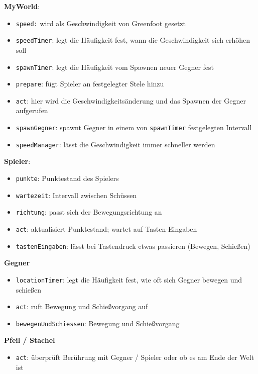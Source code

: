 \documentclass{scrartcl}   %
\begin{document}
\begin{itemize}
    \barrow \textbf{MyWorld}:
    \begin{itemize}
        \item \texttt{speed:} wird als Geschwindigkeit von Greenfoot gesetzt
        \item \texttt{speedTimer}: legt die Häufigkeit fest, wann die Geschwindigkeit sich erhöhen soll
        \item \texttt{spawnTimer}: legt die Häufigkeit vom Spawnen neuer Gegner fest
        \item \texttt{prepare}: fügt Spieler an festgelegter Stele hinzu
        \item \texttt{act}: hier wird die Geschwindigkeitsänderung und das Spawnen der Gegner aufgerufen
        \item \texttt{spawnGegner}: spawnt Gegner in einem von \texttt{spawnTimer} festgelegten Intervall
        \item \texttt{speedManager}: lässt die Geschwindigkeit immer schneller werden
    \end{itemize}
    \barrow \textbf{Spieler}:
    \begin{itemize}
        \item \texttt{punkte}: Punktestand des Spielers
        \item \texttt{wartezeit}: Intervall zwischen Schüssen
        \item \texttt{richtung}: passt sich der Bewegungsrichtung an
        \item \texttt{act}: aktualisiert Punktestand; wartet auf Tasten-Eingaben
        \item \texttt{tastenEingaben}: lässt bei Tastendruck etwas passieren (Bewegen, Schießen)
    \end{itemize}
    \barrow \textbf{Gegner}
    \begin{itemize}
        \item \texttt{locationTimer}: legt die Häufigkeit fest, wie oft sich Gegner bewegen und schießen
        \item \texttt{act}: ruft Bewegung und Schießvorgang auf
        \item \texttt{bewegenUndSchiessen}: Bewegung und Schießvorgang
    \end{itemize}
    \barrow \textbf{Pfeil / Stachel}
    \begin{itemize}
        \item \texttt{act}: überprüft Berührung mit Gegner / Spieler oder ob es am Ende der Welt ist
    \end{itemize}
\end{itemize}
\end{document}

